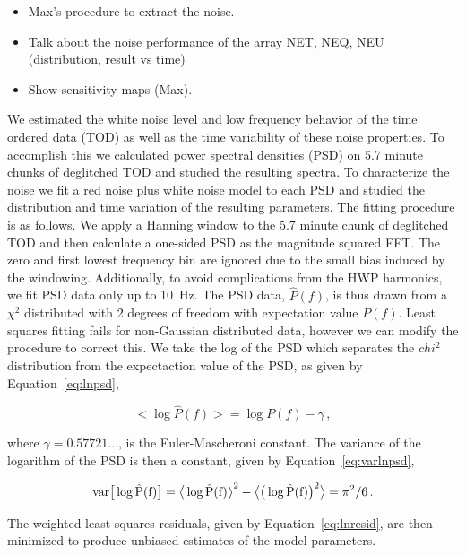 \documentclass[../EBEXPaper2.tex]{subfiles}
\begin{document}
\begin{itemize}
    \item Max's procedure to extract the noise.
    \item Talk about the noise performance of the array NET, NEQ, NEU (distribution, result vs time)
    \item Show sensitivity maps (Max).
\end{itemize}


We estimated the white noise level and low frequency behavior of the time ordered data (TOD) as well as the time variability of these noise properties. To accomplish this we calculated power spectral densities (PSD) on 5.7 minute chunks of deglitched TOD and studied the resulting spectra. To characterize the noise we fit a red noise plus white noise model to each PSD and studied the distribution and time variation of the resulting parameters. The fitting procedure is as follows. We apply a Hanning window to the 5.7 minute chunk of deglitched TOD and then calculate a one-sided PSD as the magnitude squared FFT. The zero and first lowest frequency bin are ignored due to the small bias induced by the windowing. Additionally, to avoid complications from the HWP harmonics, we fit PSD data only up to 10~Hz. The PSD data, $\hat{P}(f)$, is thus drawn from a $\chi^2$ distributed with 2 degrees of freedom with expectation value $P(f)$. Least squares fitting fails for non-Gaussian distributed data, however we can modify the procedure to correct this. We take the log of the PSD which separates the $chi^2$ distribution from the expectaction value of the PSD, as given by Equation~\ref{eq:lnpsd},

\begin{equation}
\big<\log\hat{P}(f)\big> = \log P(f) - \gamma \,,
\label{eq:lnpsd}
\end{equation}

\noindent where $\gamma = 0.57721...$, is the Euler-Mascheroni constant. The variance of the logarithm of the PSD is then a constant, given by Equation~\ref{eq:varlnpsd},

\begin{equation}
\rm{var}\big[\log\hat{P}(f)\big] = \big<\log\hat{P}(f)\big>^2 - \big<\big(\log\hat{P}(f)\big)^2\big> = \pi^2/6 \,. 
\label{eq:varlnpsd}
\end{equation}

\noindent The weighted least squares residuals, given by Equation~\ref{eq:lnresid}, are then minimized to produce unbiased estimates of the model parameters. 
\end{document}
